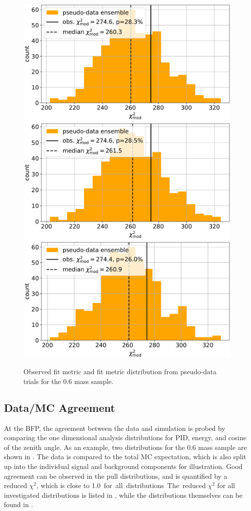 \begin{figure}[h]
    \includegraphics[width=0.32\linewidth]{figures/results/blind_fits/full_blind_fit_0.3_GeV_gauss_plus_poisson_step_3_4-1.png}
    \includegraphics[width=0.32\linewidth]{figures/results/blind_fits/full_blind_fit_0.6_GeV_gauss_plus_poisson_step_3_4-1.png}
    \includegraphics[width=0.32\linewidth]{figures/results/blind_fits/full_blind_fit_1.0_GeV_gauss_plus_poisson_step_3_4-1.png}
	\caption[Pseudo-data trials fit metric distribution (\SI{0.6}{\gev} mass)]{Observed fit metric and fit metric distribution from pseudo-data trials for the \SI{0.6}{\gev} mass sample.}
\end{figure}


\subsection{Data/MC Agreement}

At the BFP, the agreement between the data and simulation is probed by comparing the one dimensional analysis distributions for PID, energy, and cosine of the zenith angle. As an example, two distributions for the \SI{0.6}{\gev} mass sample are shown in . The data is compared to the total MC expectation, which is also split up into the individual signal and background components for illustration. Good agreement can be observed in the pull distributions, and is quantified by a reduced $\chi^2$, which is close to \SI{1.0} for all distributions. The reduced $\chi^2$ for all investigated distributions is listed in , while the distributions themselves can be found in .

